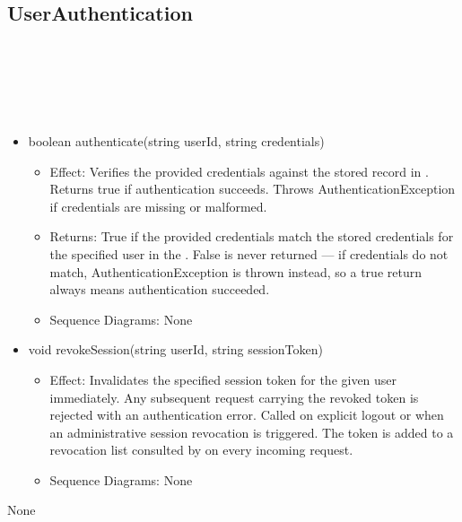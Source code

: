   \subsection{UserAuthentication}\label{int:InterfacesUserAuthentication}
    \begin{description}
      \item[Provided by:] \iconcomponent{}~
      \item[Required by:] \iconcomponent{}~ 
      \item[Operations:] ~
    \begin{itemize}[noitemsep,nolistsep,leftmargin=-.25cm]
      \item \textsf{boolean authenticate(string userId, string credentials)}
        \begin{itemize}[noitemsep,nolistsep]
           \item Effect: Verifies the provided credentials against the stored record in . Returns true if authentication succeeds. Throws AuthenticationException if credentials are missing or malformed. 
           \item Returns: True if the provided credentials match the stored credentials for the specified user in the . False is never returned — if credentials do not match, AuthenticationException is thrown instead, so a true return always means authentication succeeded.
           \item Sequence Diagrams: None
        \end{itemize}
      \item \textsf{void revokeSession(string userId, string sessionToken)}
        \begin{itemize}[noitemsep,nolistsep]
           \item Effect: Invalidates the specified session token for the given user immediately. Any subsequent request carrying the revoked token is rejected with an authentication error. Called on explicit logout or when an administrative session revocation is triggered. The token is added to a revocation list consulted by  on every incoming request. 
           \item Sequence Diagrams: None
        \end{itemize}
    \end{itemize}
      \item[Diagrams:] None
    \end{description}

